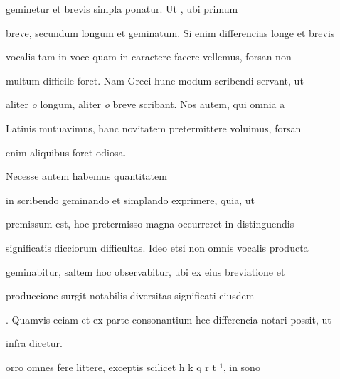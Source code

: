 geminetur et brevis simpla ponatur. Ut , ubi primum 

breve, secundum longum et geminatum. Si enim differencias longe et brevis

vocalis tam in voce quam in caractere facere vellemus, forsan non

multum difficile foret. Nam Greci hunc modum scribendi servant, ut

aliter \textit{o} longum, aliter \textit{o} breve scribant. Nos autem, qui omnia a

Latinis mutuavimus, hanc novitatem pretermittere voluimus, forsan

\splitlines{}

enim aliquibus foret odiosa.

\indentK Necesse autem habemus quantitatem 

\fulllines{}

 in scribendo geminando et simplando exprimere, quia, ut

premissum est, hoc pretermisso magna occurreret in distinguendis

significatis dicciorum difficultas. Ideo etsi non omnis vocalis producta

geminabitur, saltem hoc observabitur, ubi ex eius breviatione et

produccione surgit notabilis diversitas significati eiusdem 

. Quamvis eciam et ex parte consonantium hec differencia notari possit, ut

\splitlines{}



infra dicetur.

\indentK {}orro omnes fere littere, exceptis scilicet  h  k q r t ¹, in sono 

